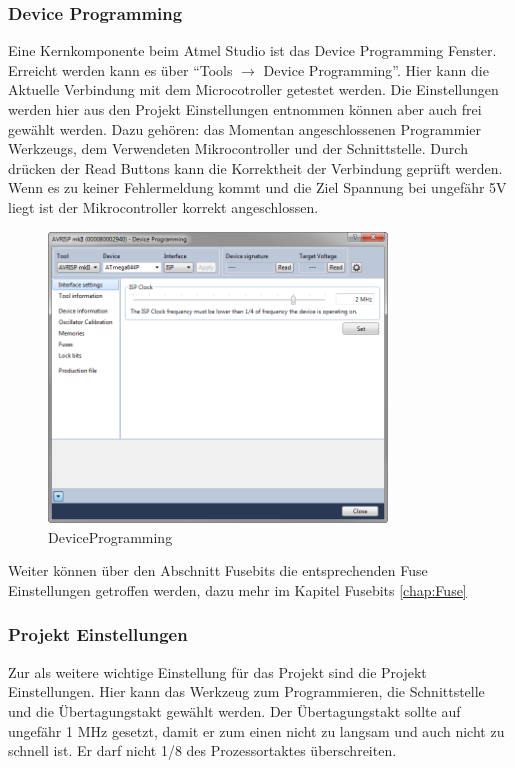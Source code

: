 \subsubsection{Device Programming}
\label{Chap:atmelStudio.Programming}

Eine Kernkomponente beim Atmel Studio ist das Device Programming Fenster.
Erreicht werden kann es über "`Tools $\to$  Device Programming"'.
Hier kann die Aktuelle Verbindung mit dem Microcotroller getestet werden. Die
Einstellungen werden hier aus den Projekt Einstellungen entnommen können aber
auch frei gewählt werden. Dazu gehören: das Momentan
angeschlossenen Programmier Werkzeugs, dem Verwendeten Mikrocontroller und der
Schnittstelle. Durch drücken der Read Buttons kann die Korrektheit der
Verbindung geprüft werden. Wenn es zu keiner Fehlermeldung kommt und die Ziel
Spannung bei ungefähr 5V liegt ist der Mikrocontroller korrekt
angeschlossen.

\begin{figure}[H]
\centering
\includegraphics[width=9cm]{content/pictures/Anleitung/neuerProzessor/AnleitungNeuerProzessor1.png}
\caption{DeviceProgramming}
\label{fig:B3}
\end{figure}

Weiter können über den Abschnitt Fusebits die entsprechenden Fuse Einstellungen
getroffen werden, dazu mehr im Kapitel Fusebits \ref{chap:Fuse}


\subsubsection{Projekt Einstellungen}

Zur als weitere wichtige Einstellung für das Projekt sind die Projekt
Einstellungen. Hier kann das Werkzeug zum Programmieren, die Schnittstelle und
die Übertagungstakt gewählt werden.
Der Übertagungstakt sollte auf ungefähr 1 MHz gesetzt, damit er zum
einen nicht zu langsam und auch nicht zu schnell ist. Er darf nicht 1/8 des
Prozessortaktes überschreiten.

